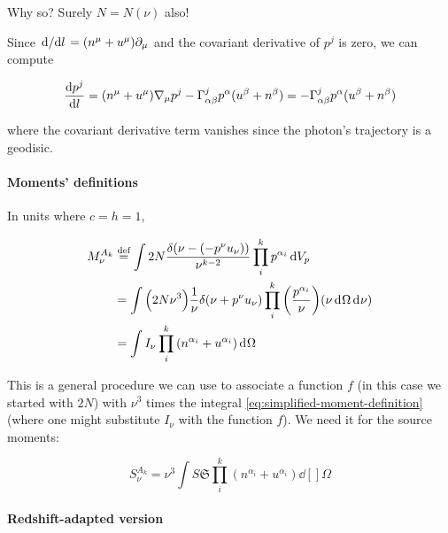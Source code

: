 \documentclass[main.tex]{subfiles}
\begin{document}
\begin{greenbox}
  Why so? Surely \(N = N(\nu)\) also!
\end{greenbox}

Since \(\dv*{}{l} = (n^\mu + u^\mu) \partial_\mu\) and the covariant derivative of \(p^j\) is zero, we can compute

\begin{equation}
  \dv{p^j}{l} = (n^\mu + u^\mu ) \nabla_\mu p^j - \Gamma ^j _{\alpha \beta} p^\alpha (u^\beta + n^\beta)
  = - \Gamma ^j _{\alpha \beta} p^\alpha (u^\beta + n^\beta)
\end{equation}

where the covariant derivative term vanishes since the photon's trajectory is a geodisic.

\paragraph{Moments' definitions}

In units where \(c=h=1\),

\begin{subequations}
\begin{align}
   M _\nu ^{A_k}
   &\defeq \int 2N \frac{\delta (\nu - (-p^\nu u_\nu))}{\nu^{k-2}} \prod_i^k p^{\alpha_i} \dd{V_p} \\
   &= \int \qty(2N \nu^3) \frac{1}{\nu} \delta (\nu +p^\nu u_\nu) \prod_i^k \qty(\frac{p^{\alpha_i}}{\nu}) \qty(\nu \dd[]{\Omega} \dd[]{\nu})  \\
   &= \int  I_\nu \prod_i^k \qty(n^{\alpha_i} + u^{\alpha_i}) \dd[]{\Omega} \label{eq:simplified-moment-definition}
\end{align}
\end{subequations}

This is a general procedure we can use to associate a function \(f\) (in this case we started with \(2N\)) with \(\nu^3\) times the integral \eqref{eq:simplified-moment-definition} (where one might substitute \(I _\nu\) with the function \(f\)).
We need it for the source moments:

\begin{equation}
   S_\nu ^{A_k} = \nu^3 \int S \mathfrak S \prod_i^k (n^{\alpha_i} + u^{\alpha_i}) \dd[]{\Omega}
\end{equation}

\paragraph{Redshift-adapted version}
\end{document}
